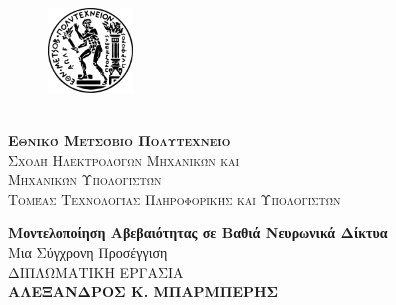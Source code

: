 \begin{titlepage}
    
    \thispagestyle{empty}    

    \vspace*{-1cm}
    
    \begingroup
        \setlength{\intextsep}{0pt}
        \setlength{\columnsep}{20pt}
        
        \begin{figure}
        \centering
        \includegraphics[width=0.2\textwidth]{images/logo/pyrforos.eps}
        
        \end{figure}
        \phantom{}\\[-7pt] %
        \LARGE{\textsc{\textbf{Εθνικό Μετσόβιο Πολυτεχνείο}}}\\[5pt]
        \Large{\textsc{Σχολή Ηλεκτρολόγων Μηχανικών
        και\\ Μηχανικών Υπολογιστών}}\\[5pt]
        \Large{\textsc{Τομέας Τεχνολογίας Πληροφορικής και Υπολογιστών}}

    \endgroup

    \begin{center}

        
        \vspace*{2cm}
            
        \Huge
        \textbf{Μοντελοποίηση Αβεβαιότητας σε Βαθιά Νευρωνικά Δίκτυα}\\
            
        \vspace{0.5cm}
        \LARGE
        Μια Σύγχρονη Προσέγγιση\\
            
        \vfill
        ΔΙΠΛΩΜΑΤΙΚΗ ΕΡΓΑΣΙΑ\\
        \vspace{0.8cm}
        \LARGE
        \textbf{ΑΛΕΞΑΝΔΡΟΣ Κ. ΜΠΑΡΜΠΕΡΗΣ}\\

        \vspace{2cm}
        \Large
        \begin{flushleft}
        \begin{tabbing}
            

\end{tabbing}
\end{flushleft}
\end{center}
\end{titlepage}
